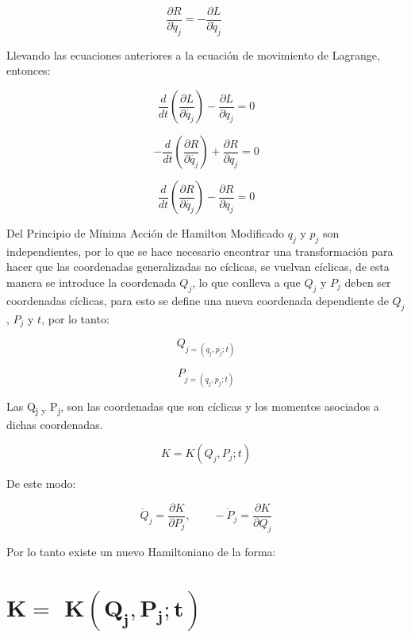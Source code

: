 \documentclass[]{article}
\begin{document}
\[\frac{\partial R}{\partial{\dot{q}}_{j}} = - \frac{\partial L}{\partial{\dot{q}}_{j}}\ \ \ \ \ \ \ \ \ \ \]

Llevando las ecuaciones anteriores a la ecuación de movimiento de
Lagrange, entonces:

\[\frac{d}{dt}\left( \frac{\partial L}{\partial\dot{q_{j}}} \right) - \frac{\partial L}{\partial q_{j}} = 0\]

\[- \frac{d}{dt}\left( \frac{\partial R}{\partial\dot{q_{j}}} \right) + \frac{\partial R}{\partial q_{j}} = 0\]

\[\frac{d}{dt}\left( \frac{\partial R}{\partial\dot{q_{j}}} \right) - \frac{\partial R}{\partial q_{j}} = 0\]

Del Principio de Mínima Acción de Hamilton Modificado \(q_{j}\) y
\(p_{j}\) son independientes, por lo que se hace necesario encontrar una
transformación para hacer que las coordenadas generalizadas no cíclicas,
se vuelvan cíclicas, de esta manera se introduce la coordenada
\(Q_{j}\), lo que conlleva a que \(Q_{j}\) y \(P_{j}\) deben ser
coordenadas cíclicas, para esto se define una nueva coordenada
dependiente de \(Q_{j}\), \(P_{j}\) y \(t\), por lo tanto:

\[Q_{j = (q_{j},p_{j};t)}\]

\[P_{j = (q_{j},p_{j};t)}\]

Las Q\textsubscript{j y} P\textsubscript{j}, son las coordenadas que son
cíclicas y los momentos asociados a dichas coordenadas.

\[K = K\left( Q_{j},P_{j};t \right)\]

De este modo:

\[{\dot{Q}}_{j} = \frac{\partial K}{\partial P_{j}},\ \ \ \ \ \ \ \ \  - {\dot{P}}_{j} = \frac{\partial K}{\partial Q_{j}}\]

Por lo tanto existe un nuevo Hamiltoniano de la forma:

\hypertarget{mathbfkmathbf-mathbfkleft-mathbfq_mathbfjmathbfmathbfp_mathbfjmathbfmathbft-right}{%
\section{\texorpdfstring{ \(\mathbf{K}\mathbf{=}\)
\(\mathbf{K}\left( \mathbf{Q}_{\mathbf{j}}\mathbf{,}\mathbf{P}_{\mathbf{j}}\mathbf{;}\mathbf{t} \right)\)}{ \textbackslash mathbf\{K\}\textbackslash mathbf\{=\} \textbackslash mathbf\{K\}\textbackslash left( \textbackslash mathbf\{Q\}\_\{\textbackslash mathbf\{j\}\}\textbackslash mathbf\{,\}\textbackslash mathbf\{P\}\_\{\textbackslash mathbf\{j\}\}\textbackslash mathbf\{;\}\textbackslash mathbf\{t\} \textbackslash right)}}\label{mathbfkmathbf-mathbfkleft-mathbfq_mathbfjmathbfmathbfp_mathbfjmathbfmathbft-right}}
\end{document}
